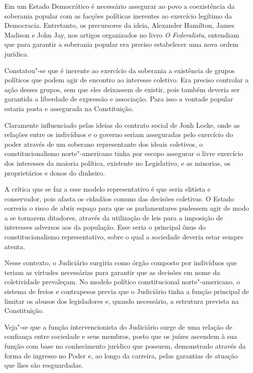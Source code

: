 Em um Estado Democrático é necessário assegurar ao povo a coexistência
da soberania popular com as facções políticas inerentes ao exercício
legítimo da Democracia. Entretanto, os precursores da ideia, Alexander
Hamilton, James Madison e John Jay, nos artigos organizados no livro \emph{O
Federalista}, entendiam que para garantir a soberania popular era
preciso estabelecer uma nova ordem jurídica.

Constatou"-se que é inerente ao exercício da soberania a existência de
grupos políticos que podem agir de encontro ao interesse coletivo. Era
preciso controlar a ação desses grupos, sem que eles deixassem de
existir, pois também deveria ser garantida a liberdade de expressão e
associação. Para isso a vontade popular estaria posta e assegurada na
Constituição.

Claramente influenciado pelas ideias do contrato social de Jonh Locke,
onde as relações entre os indivíduos e o governo seriam asseguradas
pelo exercício do poder através de um soberano representante dos ideais
coletivos, o constitucionalismo norte"-americano tinha por escopo
assegurar o livre exercício dos interesses da maioria política,
existente no Legislativo, e as minorias, os proprietários e donos do
dinheiro.

A crítica que se faz a esse modelo representativo é que seria elitista e
conservador, pois afasta os cidadãos comuns das decisões coletivas. O
Estado correria o risco de abrir espaço para que os parlamentares
pudessem agir de modo a se tornarem ditadores, através da utilização de
leis para a imposição de interesses adversos aos da população. Esse seria
o principal ônus do constitucionalismo representativo, sobre o qual a
sociedade deveria estar sempre atenta.

Nesse contexto, o Judiciário surgiria como órgão composto por indivíduos
que teriam as virtudes necessárias para garantir que as decisões em nome
da coletividade prevaleçam. No modelo político constitucional norte"-americano, o sistema de freios e contrapesos previa que o Judiciário tinha a função principal de limitar os abusos dos legisladores e, quando
necessário, a estrutura prevista na Constituição.

Veja"-se que a função intervencionista do Judiciário surge de uma relação
de confiança entre sociedade e seus membros, posto que os juízes
ascendem à sua função com base no conhecimento jurídico que possuem,
demonstrado através da forma de ingresso no Poder e, ao longo da
carreira, pelas garantias de atuação que lhes são resguardadas.

